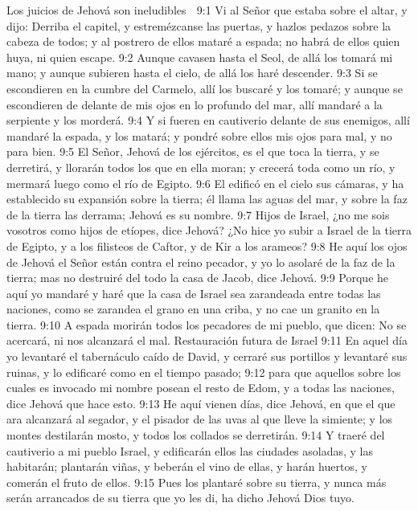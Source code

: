 Los juicios de Jehová son ineludibles  

9:1  Vi al Señor que estaba sobre el altar, y dijo: Derriba el capitel, y estremézcanse las puertas, y hazlos pedazos sobre la cabeza de todos; y al postrero de ellos mataré a espada; no habrá de ellos quien huya, ni quien escape.  
9:2 Aunque cavasen hasta el Seol, de allá los tomará mi mano; y aunque subieren hasta el cielo, de allá los haré descender.  
9:3 Si se escondieren en la cumbre del Carmelo, allí los buscaré y los tomaré; y aunque se escondieren de delante de mis ojos en lo profundo del mar, allí mandaré a la serpiente y los morderá.  
9:4 Y si fueren en cautiverio delante de sus enemigos, allí mandaré la espada, y los matará; y pondré sobre ellos mis ojos para mal, y no para bien.  
9:5 El Señor, Jehová de los ejércitos, es el que toca la tierra, y se derretirá, y llorarán todos los que en ella moran; y crecerá toda como un río, y mermará luego como el río de Egipto.  
9:6 El edificó en el cielo sus cámaras, y ha establecido su expansión sobre la tierra; él llama las aguas del mar, y sobre la faz de la tierra las derrama; Jehová es su nombre.  
9:7 Hijos de Israel, ¿no me sois vosotros como hijos de etíopes, dice Jehová? ¿No hice yo subir a Israel de la tierra de Egipto, y a los filisteos de Caftor, y de Kir a los arameos?  
9:8 He aquí los ojos de Jehová el Señor están contra el reino pecador, y yo lo asolaré de la faz de la tierra; mas no destruiré del todo la casa de Jacob, dice Jehová. 
9:9 Porque he aquí yo mandaré y haré que la casa de Israel sea zarandeada entre todas las naciones, como se zarandea el grano en una criba, y no cae un granito en la tierra.  
9:10 A espada morirán todos los pecadores de mi pueblo, que dicen: No se acercará, ni nos alcanzará el mal.  
Restauración futura de Israel  
9:11 En aquel día yo levantaré el tabernáculo caído de David, y cerraré sus portillos y levantaré sus ruinas, y lo edificaré como en el tiempo pasado;  
9:12 para que aquellos sobre los cuales es invocado mi nombre posean el resto de Edom, y a todas las naciones, dice Jehová que hace esto. 
9:13 He aquí vienen días, dice Jehová, en que el que ara alcanzará al segador, y el pisador de las uvas al que lleve la simiente; y los montes destilarán mosto, y todos los collados se derretirán.  
9:14 Y traeré del cautiverio a mi pueblo Israel, y edificarán ellos las ciudades asoladas, y las habitarán; plantarán viñas, y beberán el vino de ellas, y harán huertos, y comerán el fruto de ellos.  
9:15 Pues los plantaré sobre su tierra, y nunca más serán arrancados de su tierra que yo les di, ha dicho Jehová Dios tuyo.

